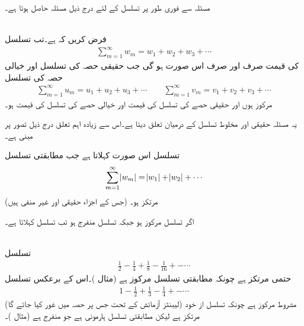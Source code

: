 مسئلہ  سے  فوری طور پر تسلسل کے لئے درج ذیل مسئلہ حاصل ہوتا ہے۔

\quad {}\\
فرض کریں کہ  ہے۔تب تسلسل
\begin{align*}
\sum_{m=1}^{\infty} w_m=w_1+w_2+w_3+\cdots
\end{align*}
کی قیمت صرف اور صرف اس صورت  ہو گی جب حقیقی حصہ کی تسلسل اور خیالی حصہ کی تسلسل 
\begin{align*}
\sum_{m=1}^{\infty} u_m=u_1+u_2+u_3+\cdots\quad \text{}\quad \sum_{m=1}^{\infty} v_m=v_1+v_2+v_3+\cdots
\end{align*}
مرکوز ہوں اور حقیقی حصے کی تسلسل کی قیمت  اور خیالی حصے کی تسلسل کی قیمت   ہو۔

یہ مسئلہ حقیقی اور مخلوط تسلسل کے درمیان تعلق دیتا ہے۔اس سے زیادہ اہم تعلق درج ذیل تصور پر مبنی ہے۔ 

تسلسل  اس صورت   کہلاتا ہے جب مطابقتی تسلسل
\begin{align}\label{مساوات_ترتیب_حتمی_مرتکز}
\sum_{m=1}^{\infty} \abs{w_m}=\abs{w_1}+\abs{w_2}+\cdots
\end{align}
(جس کے اجزاء حقیقی اور غیر منفی ہیں) مرتکز ہو۔

اگر تسلسل  مرکوز ہو جبکہ  تسلسل  منفرج ہو تب تسلسل    کہلاتا ہے۔

\quad {}\\
تسلسل
\begin{align*}
\frac{1}{2}-\frac{1}{4}+\frac{1}{8}-\frac{1}{16}+-\cdots
\end{align*}
حتمی مرتکز ہے چونکہ مطابقتی تسلسل  مرکوز ہے (مثال )۔اس کے برعکس تسلسل
\begin{align*}
1-\frac{1}{2}+\frac{1}{3}-\frac{1}{4}+-\cdots
\end{align*}
مشروط مرکوز ہے چونکہ تسلسل از خود  (لیبنٹز آزمائش  کے تحت جس پر حصہ  میں غور کیا جائے گا)   مرتکز ہے لیکن مطابقتی تسلسل  ہارمونی ہے جو منفرج ہے (مثال )۔


